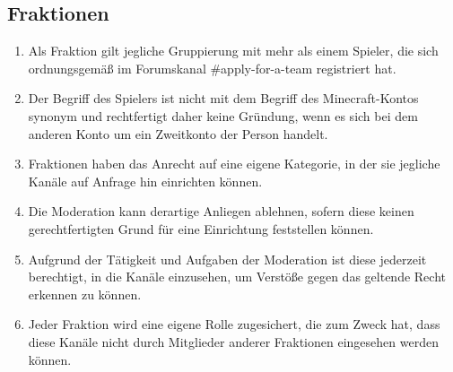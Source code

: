 \documentclass{article}
\begin{document}
\subsection{Fraktionen}
\begin{enumerate}[(1)]
	\item Als Fraktion gilt jegliche Gruppierung mit mehr als einem Spieler, die sich ordnungsgemäß im Forumskanal \#apply-for-a-team registriert hat.
	\item Der Begriff des Spielers ist nicht mit dem Begriff des Minecraft-Kontos synonym und rechtfertigt daher keine Gründung, wenn es sich bei dem anderen Konto um ein Zweitkonto der Person handelt.
	\item Fraktionen haben das Anrecht auf eine eigene Kategorie, in der sie jegliche Kanäle auf Anfrage hin einrichten können.
	\item Die Moderation kann derartige Anliegen ablehnen, sofern diese keinen gerechtfertigten Grund für eine Einrichtung feststellen können.
	\item Aufgrund der Tätigkeit und Aufgaben der Moderation ist diese jederzeit berechtigt, in die Kanäle einzusehen, um Verstöße gegen das geltende Recht erkennen zu können.
	\item Jeder Fraktion wird eine eigene Rolle zugesichert, die zum Zweck hat, dass diese Kanäle nicht durch Mitglieder anderer Fraktionen eingesehen werden können.
\end{enumerate}
\end{document}
